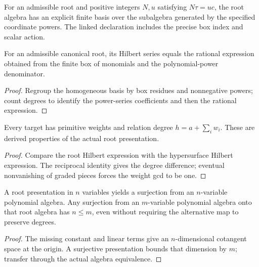 \begin{definition}
\label{def:basis}
\leanok
{}
For an admissible root and positive integers $N,u$ satisfying $N\tau=uc$, the root algebra has an explicit finite basis over the subalgebra generated by the specified coordinate powers. The linked declaration includes the precise box index and scalar action.
\end{definition}

\begin{theorem}
\label{thm:hilbert}
\leanok
For an admissible canonical root, its Hilbert series equals the rational expression obtained from the finite box of monomials and the polynomial-power denominator.
\end{theorem}
\begin{proof}
\leanok
{}
Regroup the homogeneous basis by box residues and nonnegative powers; count degrees to identify the power-series coefficients and then the rational expression.
\end{proof}

\begin{theorem}
\label{thm:numerics}
\leanok
Every target has primitive weights and relation degree $h=a+\sum_iw_i$. These are derived properties of the actual root presentation.
\end{theorem}
\begin{proof}
\leanok
{}
Compare the root Hilbert expression with the hypersurface Hilbert expression. The reciprocal identity gives the degree difference; eventual nonvanishing of graded pieces forces the weight gcd to be one.
\end{proof}

\begin{theorem}
\label{thm:minimum}
\leanok
A root presentation in $n$ variables yields a surjection from an $n$-variable polynomial algebra. Any surjection from an $m$-variable polynomial algebra onto that root algebra has $n\leq m$, even without requiring the alternative map to preserve degrees.
\end{theorem}
\begin{proof}
\leanok
{}
The missing constant and linear terms give an $n$-dimensional cotangent space at the origin. A surjective presentation bounds that dimension by $m$; transfer through the actual algebra equivalence.
\end{proof}

